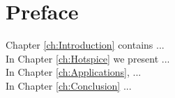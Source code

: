 \chapter*{Preface}

Chapter \ref{ch:Introduction} contains ... \\

In Chapter \ref{ch:Hotspice} we present ... \\

In Chapter \ref{ch:Applications}, ... \\

In Chapter \ref{ch:Conclusion} ...
